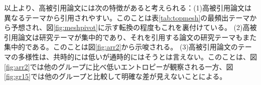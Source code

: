 以上より、高被引用論文には次の特徴があると考えられる：(1)高被引用論文は異なるテーマから引用されやすい。このことは表\ref{tab:topmesh}の最頻出テーマから予想され、図\ref{fig:meshpivot}に示す転換の程度もこれを裏付けている。
(2)高被引用論文は研究テーマが集中的であり、それを引用する論文の研究テーマもまた集中的である。このことは図\ref{fig:arr2}から示唆される。
(3)高被引用論文のテーマの多様性は、共時的には低いが通時的にはそうとは言えない。このことは、図\ref{fig:arr2}では他のグループに比べ低いエントロピーが観察される一方、図\ref{fig:gr15}では他のグループと比較して明確な差が見えないことによる。
